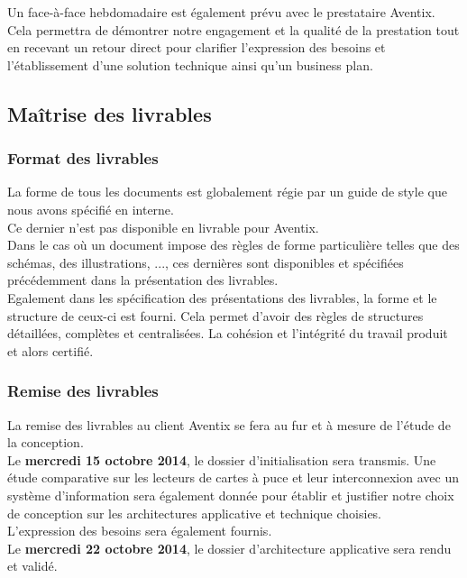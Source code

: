Un face-à-face hebdomadaire est également prévu avec le prestataire Aventix.
Cela permettra de démontrer notre engagement et la qualité de la prestation
tout en recevant un retour direct pour clarifier l'expression des besoins et
l'établissement d'une solution technique ainsi qu'un business plan. \\

\subsection{Maîtrise des livrables}
\subsubsection{Format des livrables}
La forme de tous les documents est globalement régie par un guide de style que
nous avons spécifié en interne. \\
Ce dernier n'est pas disponible en livrable pour Aventix. \\

Dans le cas où un document impose des règles de forme particulière telles que
des schémas, des illustrations, ..., ces dernières sont disponibles et
spécifiées précédemment dans la présentation des livrables. \\

Egalement dans les spécification des présentations des livrables, la forme et
le structure de ceux-ci est fourni. Cela permet d'avoir des règles de
structures détaillées, complètes et centralisées. La cohésion et l'intégrité du
travail produit et alors certifié. \\

\subsubsection{Remise des livrables}
La remise des livrables au client Aventix se fera au fur et à mesure de l'étude
de la conception. \\

Le \textbf{mercredi 15 octobre 2014}, le dossier d'initialisation sera transmis.
Une étude comparative sur les lecteurs de cartes à puce et leur interconnexion
avec un système d'information sera également donnée pour établir et justifier
notre choix de conception sur les architectures applicative et technique
choisies. \\
L'expression des besoins sera également fournis. \\

Le \textbf{mercredi 22 octobre 2014}, le dossier d'architecture applicative sera rendu
et validé. \\


